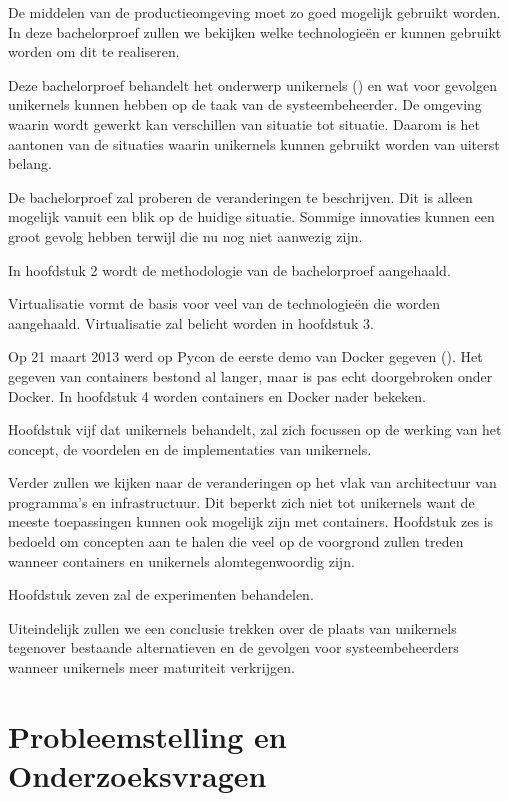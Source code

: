 \documentclass[pdftex,a4paper,12pt,twoside]{report}
\begin{document}
De middelen van de productieomgeving moet zo goed mogelijk gebruikt worden. In deze bachelorproef zullen we bekijken welke technologieën er kunnen gebruikt worden om dit te realiseren.

Deze bachelorproef behandelt het onderwerp unikernels (\cite{mao_performance_2012}) en wat voor gevolgen unikernels kunnen hebben op de taak van de systeembeheerder. De omgeving waarin wordt gewerkt kan verschillen van situatie tot situatie. Daarom is het aantonen van de situaties waarin unikernels kunnen gebruikt worden van uiterst belang.

De bachelorproef zal proberen de veranderingen te beschrijven. Dit is alleen mogelijk vanuit een blik op de huidige situatie. Sommige innovaties kunnen een groot gevolg hebben terwijl die nu nog niet aanwezig zijn.

In hoofdstuk 2 wordt de methodologie van de bachelorproef aangehaald.

Virtualisatie vormt de basis voor veel van de technologieën die worden aangehaald. Virtualisatie zal belicht worden in hoofdstuk 3.

Op 21 maart 2013 werd op Pycon de eerste demo van Docker gegeven (\cite{hykes_future_2013}). Het gegeven van containers bestond al langer, maar is pas echt doorgebroken onder Docker. In hoofdstuk 4 worden containers en Docker nader bekeken.

Hoofdstuk vijf dat unikernels behandelt, zal zich focussen op de werking van het concept, de voordelen en de implementaties van unikernels.

Verder zullen we kijken naar de veranderingen op het vlak van architectuur van programma's en infrastructuur. Dit beperkt zich niet tot unikernels want de meeste toepassingen kunnen ook mogelijk zijn met containers. Hoofdstuk zes is bedoeld om concepten aan te halen die veel op de voorgrond zullen treden wanneer containers en unikernels alomtegenwoordig zijn.

Hoofdstuk zeven zal de experimenten behandelen.

Uiteindelijk zullen we een conclusie trekken over de plaats van unikernels tegenover bestaande alternatieven en de gevolgen voor systeembeheerders wanneer unikernels meer maturiteit verkrijgen.

\section{Probleemstelling en Onderzoeksvragen}
\label{sec:onderzoeksvragen}
\end{document}
